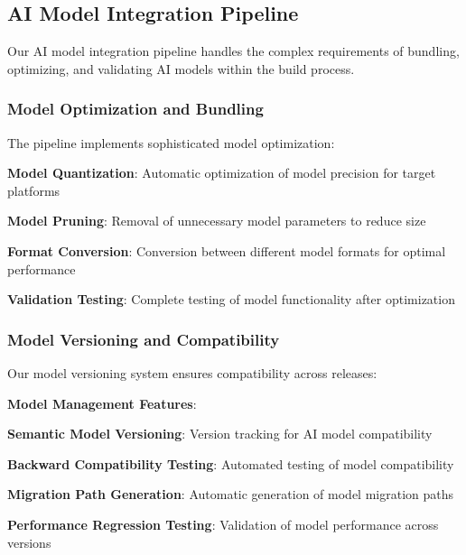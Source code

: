 \subsection*{AI Model Integration Pipeline}

Our AI model integration pipeline handles the complex requirements of bundling, optimizing, and validating AI models within the build process.

\subsubsection*{Model Optimization and Bundling}

The pipeline implements sophisticated model optimization:

\begin{expandedlist}
    \item \textbf{Model Quantization}: Automatic optimization of model precision for target platforms
    \item \textbf{Model Pruning}: Removal of unnecessary model parameters to reduce size
    \item \textbf{Format Conversion}: Conversion between different model formats for optimal performance
    \item \textbf{Validation Testing}: Complete testing of model functionality after optimization
\end{expandedlist}

\subsubsection*{Model Versioning and Compatibility}

Our model versioning system ensures compatibility across releases:

\begin{successbox}
\textbf{Model Management Features}:
\begin{compactlist}
    \item \textbf{Semantic Model Versioning}: Version tracking for AI model compatibility
    \item \textbf{Backward Compatibility Testing}: Automated testing of model compatibility
    \item \textbf{Migration Path Generation}: Automatic generation of model migration paths
    \item \textbf{Performance Regression Testing}: Validation of model performance across versions
\end{compactlist}
\end{successbox}

